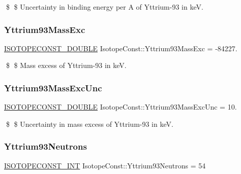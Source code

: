 \$ \$ Uncertainty in binding energy per A of Yttrium-\/93 in keV. \mbox{\label{group___isotope_const-_yttrium-_y93_ga0f3bc777d1d53f9fe1b6cccb83a4860f}} 
\subsubsection{\texorpdfstring{Yttrium93\+Mass\+Exc}{Yttrium93MassExc}}
{\footnotesize\ttfamily \mbox{\hyperlink{group___isotope_const-_macros_ga8f45a7272ce02c0b4c65c44636ed719a}{I\+S\+O\+T\+O\+P\+E\+C\+O\+N\+S\+T\+\_\+\+D\+O\+U\+B\+LE}} Isotope\+Const\+::\+Yttrium93\+Mass\+Exc = -\/84227.}

\$ \$ Mass excess of Yttrium-\/93 in keV. \mbox{\label{group___isotope_const-_yttrium-_y93_ga82046aa6af0f80e0913f1eac13bdd475}} 
\subsubsection{\texorpdfstring{Yttrium93\+Mass\+Exc\+Unc}{Yttrium93MassExcUnc}}
{\footnotesize\ttfamily \mbox{\hyperlink{group___isotope_const-_macros_ga8f45a7272ce02c0b4c65c44636ed719a}{I\+S\+O\+T\+O\+P\+E\+C\+O\+N\+S\+T\+\_\+\+D\+O\+U\+B\+LE}} Isotope\+Const\+::\+Yttrium93\+Mass\+Exc\+Unc = 10.}

\$ \$ Uncertainty in mass excess of Yttrium-\/93 in keV. \mbox{\label{group___isotope_const-_yttrium-_y93_ga27051185e370af4d378e5c43c8e3b0e2}} 
\subsubsection{\texorpdfstring{Yttrium93\+Neutrons}{Yttrium93Neutrons}}
{\footnotesize\ttfamily \mbox{\hyperlink{group___isotope_const-_macros_ga5f18360b3e99483a35c32d789e62621c}{I\+S\+O\+T\+O\+P\+E\+C\+O\+N\+S\+T\+\_\+\+I\+NT}} Isotope\+Const\+::\+Yttrium93\+Neutrons = 54}

